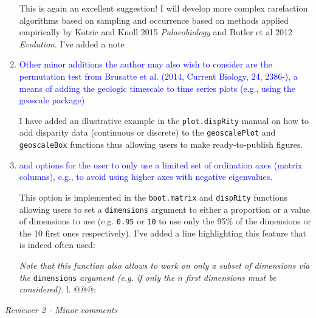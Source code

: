 \documentclass[12pt,letterpaper]{article}
\renewcommand{\subsection}[1]{%
\bigskip
\begin{center}
\begin{large}
\normalfont\itshape #1
\end{large}
\end{center}}
\begin{document}
\begin{enumerate}
This is again an excellent suggestion!
I will develop more complex rarefaction algorithms based on sampling and occurrence based on methods applied empirically by Kotric and Knoll 2015 \textit{Palaeobiology} and Butler et al 2012 \textit{Evolution}.
I've added a note 


\item{\textcolor{blue}{Other minor additions the author may also wish to consider are the permutation test from Brusatte et al. (2014, Current Biology, 24, 2386-), a means of adding the geologic timescale to time series plots (e.g., using the geoscale package)}}

I have added an illustrative example in the \texttt{plot.dispRity} manual on how to add disparity data (continuous or discrete) to the \texttt{geoscalePlot} and \texttt{geoscaleBox} functions thus allowing users to make ready-to-publish figures.

\item{\textcolor{blue}{and options for the user to only use a limited set of ordination axes (matrix columns), e.g., to avoid using higher axes with negative eigenvalues.}}

This option is implemented in the \texttt{boot.matrix} and \texttt{dispRity} functions allowing users to set a \texttt{dimensions} argument to either a proportion or a value of dimensions to use (e.g. \texttt{0.95} or \texttt{10} to use only the 95\% of the dimensions or the 10 first ones respectively). I've added a line highlighting this feature that is indeed often used:

\textit{Note that this function also allows to work on only a subset of dimensions via the} \texttt{dimensions} \textit{argument (e.g. if only the $n$ first dimensions must be considered).} l. @@@: 

\end{enumerate}

\subsection{Reviewer 2 - Minor comments}
\end{document}
